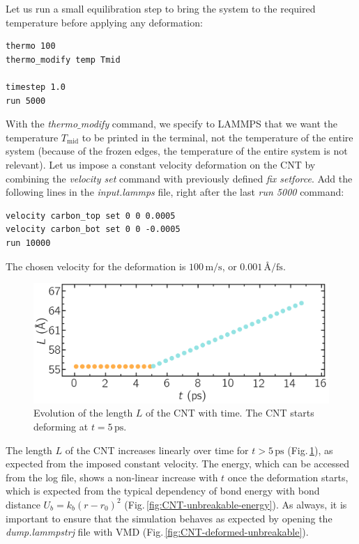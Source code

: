 \documentclass[9pt,tutorial]{livecoms}
\begin{document}
Let us run a small equilibration step to bring the system to the required temperature before applying any deformation:
{\normalsize \begin{verbatim}
thermo 100
thermo_modify temp Tmid

timestep 1.0
run 5000
\end{verbatim}}
With the \textit{thermo$\_$modify} command, we specify to LAMMPS that we want the temperature $T_\mathrm{mid}$ to be printed in the terminal, not the temperature of the entire system (because of the frozen edges, the temperature of the entire system is not relevant). Let us impose a constant velocity deformation on the CNT by combining the \textit{velocity set} command with previously defined \textit{fix setforce}. Add the following lines in the \textit{input.lammps} file, right after the last \textit{run 5000} command:
{\normalsize \begin{verbatim}
velocity carbon_top set 0 0 0.0005
velocity carbon_bot set 0 0 -0.0005
run 10000
\end{verbatim}}
\noindent The chosen velocity for the deformation is $100\,\text{m/s}$, or $0.001\,\text{\AA{}/fs}$.

\begin{figure}
\centering
\includegraphics[width=\linewidth]{CNT-lenght-unbreakable}
\caption{Evolution of the length $L$ of the CNT with time. The CNT starts deforming at $t = 5\,\text{ps}$.}
\label{fig:CNT-unbreakable-lenght}
\end{figure}

The length $L$ of the CNT increases linearly over time for $t > 5\,\text{ps}$ (Fig.\,\ref{fig:CNT-unbreakable-lenght}), as expected from the imposed constant velocity. The energy, which can be accessed from the log file, shows a non-linear increase with $t$ once the deformation starts, which is expected from the typical dependency of bond energy with bond distance $U_b = k_b \left( r - r_0 \right)^2$ (Fig.\,\ref{fig:CNT-unbreakable-energy}). As always, it is important to ensure that the simulation behaves as expected by opening the \textit{dump.lammpstrj} file with VMD (Fig.\,\ref{fig:CNT-deformed-unbreakable}).
\end{document}
